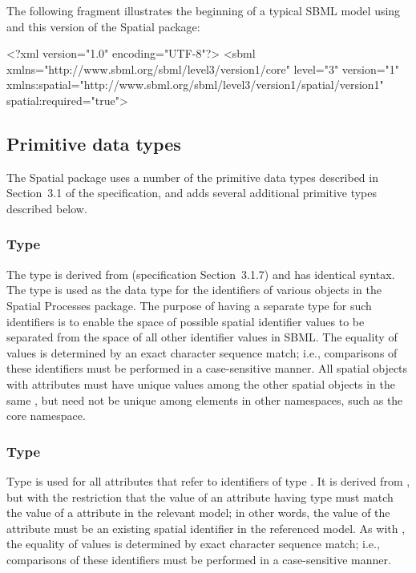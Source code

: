 The following fragment illustrates the beginning of a typical SBML model using \sbmlthreecore and this version of the Spatial package:

\begin{example}
<?xml version="1.0" encoding="UTF-8"?>
<sbml xmlns="http://www.sbml.org/sbml/level3/version1/core" level="3" version="1"
      xmlns:spatial="http://www.sbml.org/sbml/level3/version1/spatial/version1"
      spatial:required="true">
\end{example}


\subsection{Primitive data types}
\label{new-primitive-types}

The Spatial package uses a number of the primitive data types described in Section~3.1 of the \sbmlthreecore specification, and adds several additional primitive types described below.


\subsubsection{Type \fixttspace{}}
\label{primtype-SpId}

The type  is derived from 
(\sbmlthreecore specification Section~3.1.7) and has identical syntax. The  type is used as the data type for the identifiers of various objects in the Spatial Processes package.  The purpose of having a separate type for such identifiers is to enable the space of possible spatial identifier values to be separated from the space of all other identifier values in SBML.  The equality of  values is determined by an exact character sequence match; i.e., comparisons of these identifiers must be performed in a case-sensitive manner.  All spatial objects with  attributes must have unique values among the other spatial objects in the same \Model, but need not be unique among elements in other namespaces, such as the  core namespace.


\subsubsection{Type \fixttspace{}}
\label{primtype-SpIdRef}

Type  is used for all attributes that refer to identifiers of type .  It is derived from , but with the restriction that the value of an attribute having type  must match the value of a  attribute in the relevant model;  in other words, the value of the attribute must be an existing spatial identifier in the referenced model.  As with , the equality of  values is determined by exact character sequence match; i.e., comparisons of these identifiers must be performed in a case-sensitive manner.


